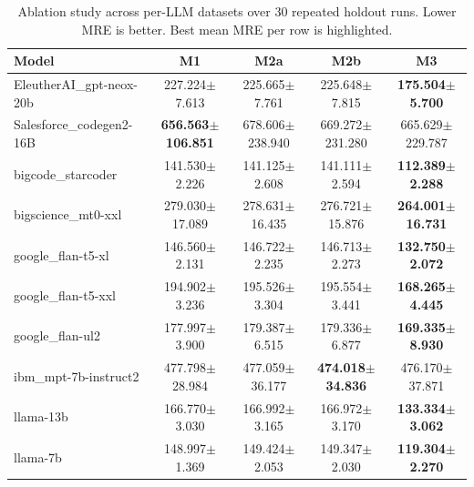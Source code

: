 \begin{table}[t]
\centering
\small
\caption{Ablation study across per-LLM datasets over 30 repeated holdout runs. Lower MRE is better. Best mean MRE per row is highlighted.}
\label{tab:ablation_mre}
\begin{tabular}{lcccc}
\toprule
Model & M1 & M2a & M2b & M3 \\
\midrule
EleutherAI\_gpt-neox-20b & 227.224$\pm$7.613 & 225.665$\pm$7.761 & 225.648$\pm$7.815 & \textbf{175.504$\pm$5.700} \\
Salesforce\_codegen2-16B & \textbf{656.563$\pm$106.851} & 678.606$\pm$238.940 & 669.272$\pm$231.280 & 665.629$\pm$229.787 \\
bigcode\_starcoder & 141.530$\pm$2.226 & 141.125$\pm$2.608 & 141.111$\pm$2.594 & \textbf{112.389$\pm$2.288} \\
bigscience\_mt0-xxl & 279.030$\pm$17.089 & 278.631$\pm$16.435 & 276.721$\pm$15.876 & \textbf{264.001$\pm$16.731} \\
google\_flan-t5-xl & 146.560$\pm$2.131 & 146.722$\pm$2.235 & 146.713$\pm$2.273 & \textbf{132.750$\pm$2.072} \\
google\_flan-t5-xxl & 194.902$\pm$3.236 & 195.526$\pm$3.304 & 195.554$\pm$3.441 & \textbf{168.265$\pm$4.445} \\
google\_flan-ul2 & 177.997$\pm$3.900 & 179.387$\pm$6.515 & 179.336$\pm$6.877 & \textbf{169.335$\pm$8.930} \\
ibm\_mpt-7b-instruct2 & 477.798$\pm$28.984 & 477.059$\pm$36.177 & \textbf{474.018$\pm$34.836} & 476.170$\pm$37.871 \\
llama-13b & 166.770$\pm$3.030 & 166.992$\pm$3.165 & 166.972$\pm$3.170 & \textbf{133.334$\pm$3.062} \\
llama-7b & 148.997$\pm$1.369 & 149.424$\pm$2.053 & 149.347$\pm$2.030 & \textbf{119.304$\pm$2.270} \\
\bottomrule
\end{tabular}
\end{table}